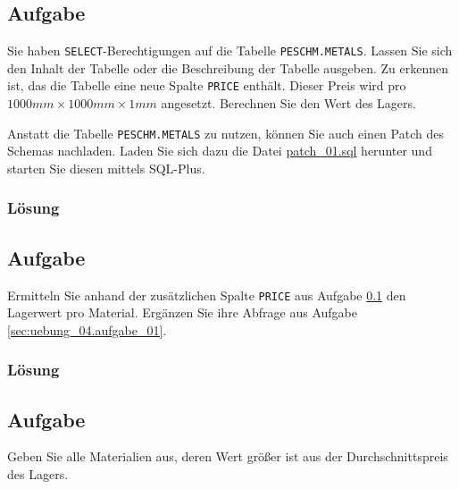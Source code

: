 \subsection{Aufgabe}
\label{sec:uebung_04.aufgabe_04}
Sie haben \texttt{SELECT}-Berechtigungen auf die Tabelle \texttt{PESCHM.METALS}. Lassen Sie sich den Inhalt der Tabelle oder die Beschreibung der Tabelle ausgeben. Zu erkennen ist, das die Tabelle eine neue Spalte \texttt{PRICE} enthält. Dieser Preis wird pro $1000mm\times1000mm\times1mm$ angesetzt. Berechnen Sie den Wert des Lagers.

\begin{info-popup}
  Anstatt die Tabelle \texttt{PESCHM.METALS} zu nutzen, können Sie auch einen Patch des Schemas nachladen. Laden Sie sich dazu die Datei \href{https://raw.githubusercontent.com/fh-trier/tgdb_ws1819/master/sql/patch_01.sql}{patch\_01.sql} herunter und starten Sie diesen mittels SQL-Plus.
\end{info-popup}

\subsubsection*{Lösung}
\label{sec:uebung_04.aufgabe_04.loesung}

\subsection{Aufgabe}
\label{sec:uebung_04.aufgabe_05}
Ermitteln Sie anhand der zusätzlichen Spalte \texttt{PRICE} aus Aufgabe \ref{sec:uebung_04.aufgabe_04} den Lagerwert pro Material. Ergänzen Sie ihre Abfrage aus Aufgabe \ref{sec:uebung_04.aufgabe_01}.

\subsubsection*{Lösung}
\label{sec:uebung_04.aufgabe_05.loesung}

\subsection{Aufgabe}
\label{sec:uebung_04.aufgabe_06}
Geben Sie alle Materialien aus, deren Wert größer ist aus der Durchschnittspreis des Lagers.

